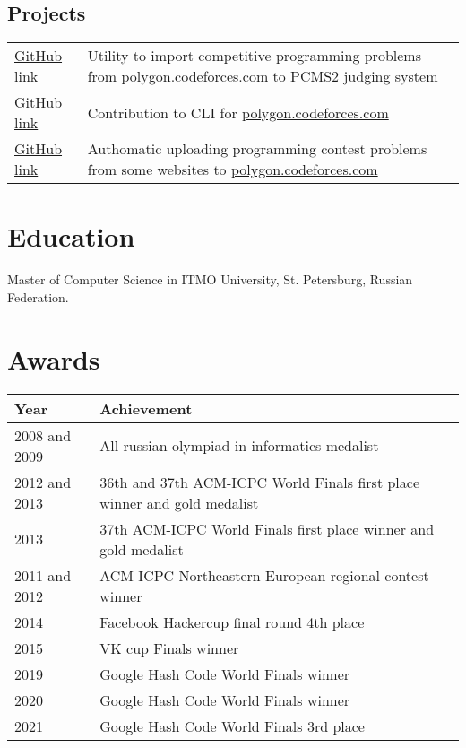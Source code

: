 \documentclass[11pt,a4paper,oneside]{article}
\begin{document}
\subsection{Projects}
  \begin{tabular}{l|p{12cm}}
    \href{https://github.com/ilsaf13/PolygonContestImporter}{GitHub link} & Utility to import competitive programming problems from \href{https://polygon.codeforces.com}{polygon.codeforces.com} to PCMS2 judging system \\
    \href{https://github.com/kunyavskiy/polygon-cli}{GitHub link} & Contribution to CLI for \href{https://polygon.codeforces.com}{polygon.codeforces.com} \\
    \href{https://github.com/niyaznigmatullin/polygon-uploader}{GitHub link} & Authomatic uploading programming contest problems from some websites to \href{https://polygon.codeforces.com}{polygon.codeforces.com} \\
  \end{tabular}
\section{Education}
    Master of Computer Science in ITMO University, St. Petersburg, Russian Federation.

\section{Awards}
\begin{center}
    \begin{tabular}{l|l}
        Year&Achievement \\
        \hline
        2008 and 2009& All russian olympiad in informatics medalist \\
        2012 and 2013 &36th and 37th ACM-ICPC World Finals first place winner and gold medalist \\
        2013&37th ACM-ICPC World Finals first place winner and gold medalist \\
        2011 and 2012&ACM-ICPC Northeastern European regional contest winner \\
        2014 & Facebook Hackercup final round 4th place \\
        2015 & VK cup Finals winner \\
        2019 & Google Hash Code World Finals winner \\
        2020 & Google Hash Code World Finals winner \\
        2021 & Google Hash Code World Finals 3rd place \\
    \end{tabular}
\end{center}
\end{document}
